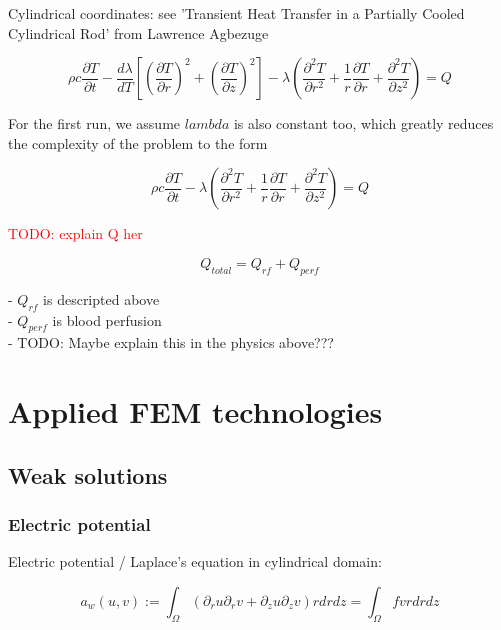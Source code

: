 \documentclass[parskip=half, titlepage=yes, 12pt, BCOR=12mm, DIV=calc]{scrartcl}
\begin{document}
Cylindrical coordinates: see 'Transient Heat Transfer in a Partially Cooled Cylindrical Rod' from Lawrence Agbezuge

\begin{equation}
    \rho c \frac{\partial T}{\partial t} -  \frac{d\lambda}{dT} \left[ \left( \frac{\partial T}{\partial r} \right)^2 + \left( \frac{\partial T}{\partial z} \right)^2 \right] - \lambda \left( \frac{\partial^2 T}{\partial r^2} + \frac{1}{r} \frac{\partial T}{\partial r} + \frac{\partial^2 T}{\partial z^2} \right) = Q
\end{equation}

For the first run, we assume $lambda$ is also constant too, which greatly reduces the complexity of the problem to the form

\begin{equation}
    \rho c \frac{\partial T}{\partial t} - \lambda \left( \frac{\partial^2 T}{\partial r^2} + \frac{1}{r} \frac{\partial T}{\partial r} + \frac{\partial^2 T}{\partial z^2} \right) = Q
\end{equation}

\textcolor{red}{TODO: explain Q her}

\begin{equation}
    Q_{total} = Q_{rf} + Q_{perf}
\end{equation}

- $Q_{rf}$ is descripted above \\
- $Q_{perf}$ is blood perfusion \\
- TODO: Maybe explain this in the physics above??? \\






\section{Applied FEM technologies}

\subsection{Weak solutions}
\subsubsection{Electric potential}

Electric potential / Laplace's equation in cylindrical domain:

\begin{equation}
    a_w(u,v) := \int_{\Omega} (\partial_r u \partial_r v + \partial_z u \partial_z v) r drdz = \int_{\Omega} f v r dr dz
\end{equation}
\end{document}
